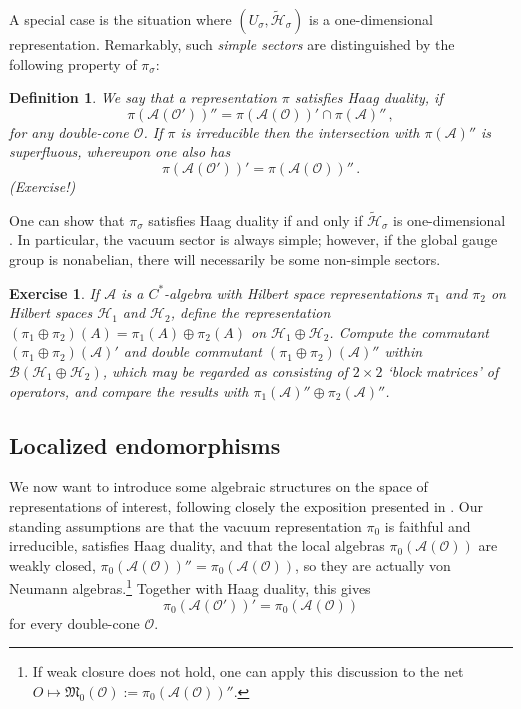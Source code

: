 \documentclass[12pt,a4paper]{article}
\newcommand{\1}{\mathds{1}}                         %
\newcommand{\Hcal}{\mathcal {H}}
\newcommand{\Ocal}{\mathcal{O}}
\newcommand{\BB}{{\mathcal{B}}}
\newcommand{\HH}{{\mathcal{H}}}
\newcommand{\Mf}{{\mathfrak{M}}}
\newcommand{\Ac}{{\mathcal{A}}}
\newcommand{\be}{\begin{equation}}
\newcommand{\ee}{\end{equation}}
\newtheorem{exercise}[theorem]{Exercise}
\newtheorem{df}[theorem]{Definition}}
\begin{document}
 A special case is the situation where $(U_\sigma,\tilde{\Hcal}_\sigma)$ is a one-dimensional representation. 
  Remarkably, such \emph{simple sectors} are distinguished by the following property of $\pi_\sigma$:
\begin{df}
	We say that a representation $\pi$ satisfies \emph{Haag duality}, if  
				\be\label{Haagdual}
				\pi(\Ac(\Ocal'))''=\pi(\Ac(\Ocal))'\cap \pi(\Ac)''\,,
				\ee 
				for any double-cone $\Ocal$. 
				If $\pi$ is irreducible then the intersection with $\pi(\Ac)''$ is superfluous, 
				whereupon one also has
				\be\label{Haagdual2}
			 \pi(\Ac(\Ocal'))'=\pi(\Ac(\Ocal))''\,.
			 \ee
			(\emph{Exercise!})
\end{df}
One can show that $\pi_\sigma$ satisfies Haag duality if and only if $\tilde{\Hcal}_\sigma$ is one-dimensional \cite{DHR1}.  In particular, the vacuum sector is always simple; however, if the 
global gauge group is nonabelian, there will necessarily be some non-simple sectors.

\begin{exercise}
	If $\Ac$ is a $C^*$-algebra with Hilbert space representations $\pi_1$ and $\pi_2$ on Hilbert spaces $\HH_1$ and $\HH_2$, define the representation $(\pi_1\oplus\pi_2)(A)=\pi_1(A)\oplus \pi_2(A)$ on $\HH_1\oplus\HH_2$. Compute
	the commutant $(\pi_1\oplus\pi_2)(\Ac)'$ and double commutant $(\pi_1\oplus\pi_2)(\Ac)''$ within $\BB(\HH_1\oplus\HH_2)$, which may be regarded as consisting of $2\times 2$ `block matrices' of operators, and compare the results with $\pi_1(\Ac)''\oplus \pi_2(\Ac)''$. 
\end{exercise}
 

\subsection{Localized endomorphisms}
We now want to introduce some algebraic structures on the space  of representations of interest, following closely the exposition presented in \cite{KlausSuperselection}. Our standing assumptions are that the vacuum representation $\pi_0$ is faithful and irreducible, satisfies Haag duality, and that the local algebras $\pi_0(\Ac(\Ocal))$ are weakly closed, $\pi_0(\Ac(\Ocal))''=\pi_0(\Ac(\Ocal))$, so they are actually von Neumann algebras.\footnote{If weak closure does not hold, one can apply this discussion to the net $O\mapsto \Mf_0(\Ocal):=\pi_0(\Ac(\Ocal))''$.} Together with Haag duality, this gives
\be\label{Haagdual3}
			 \pi_0(\Ac(\Ocal'))'=\pi_0(\Ac(\Ocal))
\ee
for every double-cone $\Ocal$.
\end{document}
